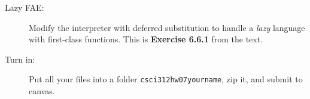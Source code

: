 \documentclass[12pt]{article}
\author{CSCI 312 Homework 7}
\title{}
\begin{document}
\maketitle

\begin{description}

\item[Lazy FAE:]  Modify the interpreter with deferred substitution
to handle a {\em lazy} language with first-class functions.  This is {\bf Exercise 6.6.1}
from the text.

\item[Turn in:] Put all your files into a folder {\tt csci312hw07yourname},
zip it, and submit to canvas.
  
  
  

\end{description}
\end{document}
